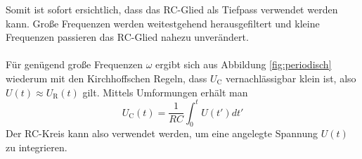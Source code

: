 Somit ist sofort ersichtlich, dass das RC-Glied als Tiefpass verwendet werden kann. Große Frequenzen werden weitestgehend herausgefiltert und kleine Frequenzen passieren das RC-Glied nahezu unverändert. \\
\\Für genügend große Frequenzen  $\omega$ ergibt sich aus Abbildung \ref{fig:periodisch} wiederum mit den Kirchhoffschen Regeln, dass $U_\text{C}$ vernachlässigbar klein ist, also $U(t) \approx U_\text{R}(t)$ gilt.
Mittels Umformungen erhält man
\begin{equation}
	U_\text{C}(t)=\frac{1}{RC} \int_{0}^{t} U(t') dt'
\end{equation}
Der RC-Kreis kann also verwendet werden,  um eine angelegte Spannung $U(t)$ zu integrieren.
